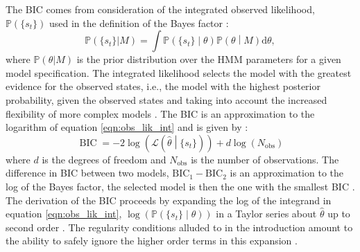 The BIC comes from consideration of the integrated observed likelihood, $\mathbb{P}\left(\{s_t\}\right)$ used in the definition of the Bayes factor \cite{kassBayesFactors1995}: 
\begin{equation}\label{eqn:obs_lik_int}
       \mathbb{P}\left(\{s_t\}|M\right) = \int \mathbb{P}\left(\{s_t\}\middle|\theta \right)\mathbb{P}\left(\theta \middle | M\right) \mathrm{d}\theta,
\end{equation}
where $\mathbb{P}(\theta|M)$ is the prior distribution over the HMM parameters for a given model specification. The integrated likelihood selects the model with the greatest evidence for the observed states, i.e., the model with the highest posterior probability, given the observed states and taking into account the increased flexibility of more complex models \cite{mackay2003information,kassBayesFactors1995}. The BIC is an approximation to the logarithm of equation \ref{eqn:obs_lik_int} and is given by \cite{schwarzEstimatingDimensionModel1978a}:
\begin{equation}\label{eqn:bic}
    \operatorname{BIC} = -2\log{\left(\mathcal{L}\left(\hat{\theta}\middle| \{s_t\}\right)\right)} + d\log{\left(N_{\mathrm{obs}}\right)}
\end{equation}
where $d$ is the degrees of freedom and $N_{\mathrm{obs}}$ is the number of observations.  The difference in BIC between two models, $\mathrm{BIC}_{1}-\mathrm{BIC}_{2}$ is an approximation to the log of the Bayes factor, the selected model is then the one with the smallest BIC \cite{friedman2001elements}.  The derivation of the BIC proceeds by expanding the log of the integrand in equation \ref{eqn:obs_lik_int},  $\log{\left(\mathbb{P}\left(\{s_{t}\}\middle |\theta \right)\right)}$ in a Taylor series about $\hat{\theta}$ up to second order \cite{mclachlanFiniteMixtureModels2000, friedman2001elements}. The regularity conditions alluded to in the introduction amount to the ability to safely ignore the higher order terms in this expansion \cite{mclachlanFiniteMixtureModels2000}.


